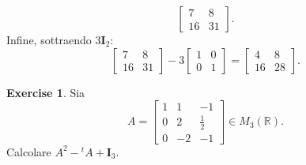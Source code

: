 \documentclass{article}
\theoremstyle{plain}
\theoremstyle{definition}
\newtheorem{xca}[exmp]{Exercise}
\theoremstyle{remark}
\begin{document}
\begin{enumerate}
\[    \begin{bmatrix}7&8\\16&31\end{bmatrix}.
    \]
    Infine, sottraendo \(3\mathbf{I}_2\):
    \[
    \begin{bmatrix}7&8\\16&31\end{bmatrix}-
    3\begin{bmatrix}1&0\\0&1\end{bmatrix}=
    \begin{bmatrix}4&8\\16&28\end{bmatrix}.
    \]
\end{enumerate}

\vspace{10pt}

\begin{bxthm}
\begin{xca}
    Sia 
    \[A=\begin{bmatrix}
        1 & 1 & -1\\[4mm]
        0 & 2 & \frac{1}{2}\\[4mm]
        0 & -2 & -1
    \end{bmatrix}\in M_3(\mathbb{R}).\]
    Calcolare \(A^2-{}^{t}A+\mathbf{I}_3.\)
\end{xca}
\end{bxthm}
\end{document}
